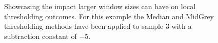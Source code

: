 \begin{figure}
	\caption[Showcasing the impact larger window sizes can have on local thresholding outcomes.]{Showcasing the impact larger window sizes can have on local thresholding outcomes. For this example the Median and MidGrey thresholding methods have been applied to sample 3 with a subtraction constant of $-5$.}
	\label{fig:local_window_size_showcase}
\end{figure}
 
